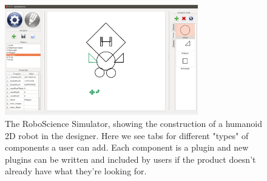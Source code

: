 \begin{figure}[!htb]
	\begin{center}
		\includegraphics[width=0.75\textwidth]{./Images/designer_weird_robot}
	\end{center}
	\caption{The RoboScience Simulator, showing the construction of a humanoid 2D robot in the designer. Here we see tabs for different "types" of components a user can add. Each component is a plugin and new plugins can be written and included by users if the product doesn't already have what they're looking for. \label{mvp3}}
\end{figure}